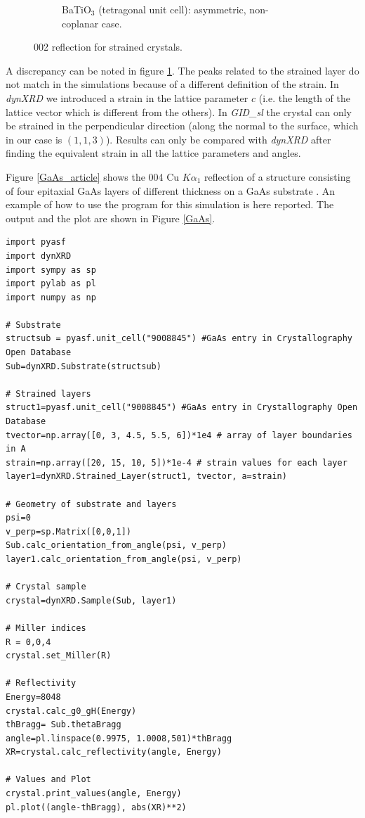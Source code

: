 \documentclass[12pt,oneside,notitlepage,abstracton,a4paper]{scrartcl}
\begin{document}
\begin{figure}[h]
\begin{subfigure}[h]{0.49\textwidth}
  \caption{BaTiO$ _3$ (tetragonal unit cell): asymmetric, non-coplanar case.}\label{test14}
  \label{test14}
 \end{subfigure}
 \caption{002 reflection for strained crystals.}\label{testsstrain}
\end{figure}

A discrepancy can be noted in figure \ref{test14}. The peaks related to the strained layer do not match in the simulations because of a different definition of the strain. In \textit{dynXRD} we introduced a strain in the lattice parameter $c$ (i.e. the length of the lattice vector which is different from the others). In \textit{GID\_sl} the crystal can only be strained in the perpendicular direction (along the normal to the surface, which in our case is $(1, 1, 3)$). Results can only be compared with \textit{dynXRD} after finding the equivalent strain in all the lattice parameters and angles.

Figure \ref{GaAs_article} shows the 004 Cu $K\alpha_1$ reflection of a structure consisting of four epitaxial GaAs layers of different thickness on a GaAs substrate \cite{Bartels:a25435}. An example of how to use the program for this simulation is here reported. The output and the plot are shown in Figure \ref{GaAs}.

\begin{lstlisting}
import pyasf
import dynXRD
import sympy as sp
import pylab as pl
import numpy as np

# Substrate
structsub = pyasf.unit_cell("9008845") #GaAs entry in Crystallography Open Database
Sub=dynXRD.Substrate(structsub)

# Strained layers
struct1=pyasf.unit_cell("9008845") #GaAs entry in Crystallography Open Database
tvector=np.array([0, 3, 4.5, 5.5, 6])*1e4 # array of layer boundaries in A
strain=np.array([20, 15, 10, 5])*1e-4 # strain values for each layer
layer1=dynXRD.Strained_Layer(struct1, tvector, a=strain)

# Geometry of substrate and layers
psi=0
v_perp=sp.Matrix([0,0,1])
Sub.calc_orientation_from_angle(psi, v_perp)
layer1.calc_orientation_from_angle(psi, v_perp)

# Crystal sample    
crystal=dynXRD.Sample(Sub, layer1)

# Miller indices
R = 0,0,4
crystal.set_Miller(R)

# Reflectivity
Energy=8048
crystal.calc_g0_gH(Energy)
thBragg= Sub.thetaBragg
angle=pl.linspace(0.9975, 1.0008,501)*thBragg
XR=crystal.calc_reflectivity(angle, Energy)

# Values and Plot
crystal.print_values(angle, Energy)
pl.plot((angle-thBragg), abs(XR)**2)
\end{lstlisting}
\end{document}
